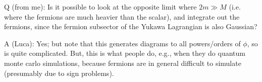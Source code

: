 Q (from me): Is it possible to look at the opposite limit where $2m \gg M$ (i.e. where the fermions are much heavier than the scalar), and integrate out the fermions, since the fermion subsector of the Yukawa Lagrangian is also Gaussian?

A (Luca): Yes; but note that this generates diagrams to all powers/orders of $\phi$, so is quite complicated. But, this is what people do, e.g., when they do quantum monte carlo simulations, because fermions are in general difficult to simulate (presumably due to sign problems).